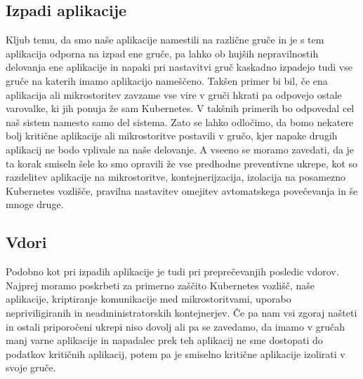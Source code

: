 \documentclass[a4paper, 12pt]{book}
\begin{document}
\subsection{Izpadi aplikacije}
Kljub temu, da smo naše aplikacije namestili na različne gruče in je s tem aplikacija odporna na izpad ene gruče, pa lahko ob hujših nepravilnostih delovanja ene aplikacije in napaki pri nastavitvi gruč kaskadno izpadejo tudi vse gruče na katerih imamo aplikacijo nameščeno.
Takšen primer bi bil, če ena aplikacija ali mikrostoritev zavzame vse vire v gruči hkrati pa odpovejo ostale varovalke, ki jih ponuja že sam Kubernetes.
V takšnih primerih bo odpovedal cel naš sistem namesto samo del sistema.
Zato se lahko odločimo, da bomo nekatere bolj kritične aplikacije ali mikrostoritve postavili v gručo, kjer napake drugih aplikacij ne bodo vplivale na naše delovanje.
A vseeno se moramo zavedati, da je ta korak smiseln šele ko smo opravili že vse predhodne preventivne ukrepe, kot so razdelitev aplikacije na mikrostoritve, kontejnerijzacija, izolacija na posamezno Kubernetes vozlišče, pravilna nastavitev omejitev avtomatskega povečevanja in še mnoge druge.
\subsection{Vdori}
Podobno kot pri izpadih aplikacije je tudi pri preprečevanjih posledic vdorov.
Najprej moramo poskrbeti za primerno zaščito Kubernetes vozlišč, naše aplikacije, kriptiranje komunikacije med mikrostoritvami, uporabo nepriviligiranih in neadministratorskih kontejnerjev.
Če pa nam vsi zgoraj našteti in ostali priporočeni ukrepi niso dovolj ali pa se zavedamo, da imamo v gručah manj varne aplikacije in napadalec prek teh aplikacij ne sme dostopati do podatkov kritičnih aplikacij, potem pa je smiselno kritične aplikacije izolirati v svoje gruče.
\end{document}
